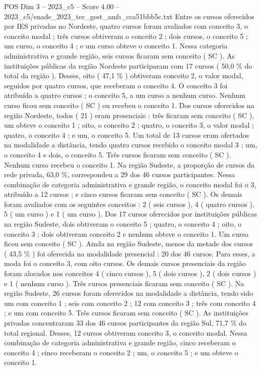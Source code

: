 \begin{textsample}{POS Dim 3 – 2023\_c5 – Score 4.00 – 2023\_c5/enade\_2023\_tec\_gest\_amb\_cca51bbb5c.txt}
Entre os cursos oferecidos por IES privadas no Nordeste, quatro cursos foram avaliados com conceito 3, o conceito modal ; três cursos obtiveram o conceito 2 ; dois cursos, o conceito 5 ; um curso, o conceito 4 ; e um curso obteve o conceito 1.
Nessa categoria administrativa e grande região, seis cursos ficaram sem conceito ( SC ).
As instituições públicas da região Nordeste participaram com 17 cursos ( 50,0 \% do total da região ).
Desses, oito ( 47,1 \% ) obtiveram conceito 2, o valor modal, seguidos por quatro cursos, que receberam o conceito 4.
O conceito 3 foi atribuído a quatro cursos ; o conceito 5, a um curso a nenhum curso.
Nenhum curso ficou sem conceito ( SC ) ou recebeu o conceito 1.
Dos cursos oferecidos na região Nordeste, todos ( 21 ) eram presenciais : três ficaram sem conceito ( SC ), um obteve o conceito 1 ; oito, o conceito 2 ; quatro, o conceito 3, o valor modal ; quatro, o conceito 4 ; e um, o conceito 5.
Um total de 13 cursos eram ofertados na modalidade a distância, tendo quatro cursos recebido o conceito modal 3 ; um, o conceito 4 e dois, o conceito 5.
Três cursos ficaram sem conceito ( SC ).
Nenhum curso recebeu o conceito 1.
Na região Sudeste, a proporção de cursos da rede privada, 63,0 \%, correspondeu a 29 dos 46 cursos participantes.
Nessa combinação de categoria administrativa e grande região, o conceito modal foi o 3, atribuído a 12 cursos ; e cinco cursos ficaram sem conceito ( SC ).
Os demais foram avaliados com os seguintes conceitos : 2 ( seis cursos ), 4 ( quatro cursos ), 5 ( um curso ) e 1 ( um curso ).
Dos 17 cursos oferecidos por instituições públicas na região Sudeste, dois obtiveram o conceito 5 ; quatro, o conceito 4 ; oito, o conceito 3 ; dois obtiveram conceito 2 e nenhum obteve o conceito 1.
Um curso ficou sem conceito ( SC ).
Ainda na região Sudeste, menos da metade dos cursos ( 43,5 \% ) foi oferecida na modalidade presencial : 20 dos 46 cursos.
Para esses, a moda foi o conceito 3, com oito cursos.
Os demais cursos presenciais da região foram alocados nos conceitos 4 ( cinco cursos ), 5 ( dois cursos ), 2 ( dois cursos ) e 1 ( nenhum curso ).
Três cursos presenciais ficaram sem conceito ( SC ).
Na região Sudeste, 26 cursos foram oferecidos na modalidade a distância, tendo sido um com conceito 1 ; seis com conceito 2 ; 12 com conceito 3 ; três com conceito 4 ; e um com conceito 5.
Três cursos ficaram sem conceito ( SC ).
As instituições privadas concentraram 33 dos 46 cursos participantes da região Sul, 71,7 \% do total regional.
Desses, 12 cursos obtiveram conceito 3, o conceito modal.
Nessa combinação de categoria administrativa e grande região, cinco receberam o conceito 4 ; cinco receberam o conceito 2 ; um, o conceito 5 ; e um obteve o conceito 1.

\end{textsample}
